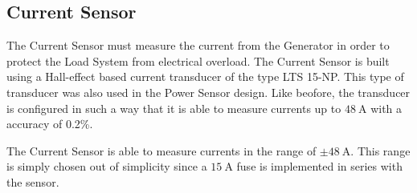 \subsection{Current Sensor}
The Current Sensor must measure the current from the Generator in order to protect the Load System from electrical overload. The Current Sensor is built using a Hall-effect based current transducer of the type LTS 15-NP. This type of transducer was also used in the Power Sensor design. Like beofore, the transducer is configured in such a way that it is able to measure currents up to $\SI{48}{\ampere}$ with a accuracy of 0.2\%.

The Current Sensor is able to measure currents in the range of $\pm \SI{48}{\ampere}$. This range is simply chosen out of simplicity since a $\SI{15}{\ampere}$ fuse is implemented in series with the sensor.